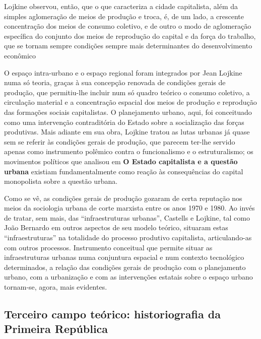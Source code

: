 Lojkine observou, então, que o que caracteriza a cidade capitalista, além da simples aglomeração de meios de produção e troca, é, de um lado, a crescente concentração dos meios de consumo coletivo, e de outro o modo de aglomeração específica do conjunto dos meios de reprodução do capital e da força do trabalho, que se tornam sempre condições sempre mais determinantes do desenvolvimento econômico \cite[p.~146-147]{LOJKINE1997}

O espaço intra-urbano e o espaço regional foram integrados por Jean Lojkine numa só teoria, graças à sua concepção renovada de condições gerais de produção, que permitiu-lhe incluir num só quadro teórico o consumo coletivo, a circulação material e a concentração espacial dos meios de produção e reprodução das formações sociais capitalistas. O planejamento urbano, aqui, foi conceituado como uma intervenção contraditória do Estado sobre a socialização das forças produtivas. Mais adiante em sua obra, Lojkine tratou as lutas urbanas já quase sem se referir às condições gerais de produção, que parecem ter-lhe servido apenas como instrumento polêmico contra o funcionalismo e o estruturalismo; os movimentos políticos que analisou em \textbf{O Estado capitalista e a questão urbana} existiam fundamentalmente como reação às consequências do capital monopolista sobre a questão urbana.

Como se vê, as condições gerais de produção gozaram de certa reputação nos meios da sociologia urbana de corte marxista entre os anos 1970 e 1980. Ao invés de tratar, sem mais, das ``infraestruturas urbanas'', Castells e Lojkine, tal como João Bernardo em outros aspectos de seu modelo teórico, situaram estas ``infraestruturas'' na totalidade do processo produtivo capitalista, articulando-as com outros processos. Instrumento conceitual que permite situar as infraestruturas urbanas numa conjuntura espacial e num contexto tecnológico determinados, a relação das condições gerais de produção com o planejamento urbano, com a urbanização e com as intervenções estatais sobre o espaço urbano tornam-se, agora, mais evidentes.

\subsection[Terceiro campo teórico: historiografia da Primeira República]{Terceiro campo teórico: historiografia da Primeira República}
\label{subsec:histprirep}

